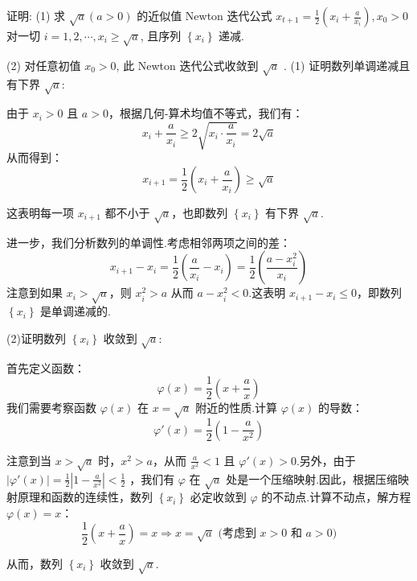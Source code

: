 \begin{tcolorbox}[enhanced,colback=10,colframe=9,breakable,coltitle=green!25!black,title=2024]
  
证明: (1) 求 $ \sqrt{a}(a>0) $ 的近似值 Newton 迭代公式
$x_{t+1}=\frac{1}{2}\left(x_{i}+\frac{a}{x_{i}}\right),  x_{0}>0$
对一切 $ i=1,2, \cdots, x_{i} \geq \sqrt{a} $, 且序列 $\left\{x_{i}\right\} $ 递减.

(2) 对任意初值 $ x_{0}>0 $, 此 Newton 迭代公式收敛到 $ \sqrt{a} $ .
\tcblower
(1) 证明数列单调递减且有下界 \(\sqrt{a}\):

由于 \( x_i > 0 \) 且 \( a > 0 \)，根据几何-算术均值不等式，我们有：
\[ x_i + \frac{a}{x_i} \geq 2\sqrt{x_i \cdot \frac{a}{x_i}} = 2\sqrt{a} \]
从而得到：
\[ x_{i+1} = \frac{1}{2}\left(x_i +\frac{a}{x_i}\right) \geq \sqrt{a} \]

这表明每一项 \( x_{i+1} \) 都不小于 \( \sqrt{a} \)，也即数列 \(\left\{x_i\right\}\) 有下界 \(\sqrt{a}\).

进一步，我们分析数列的单调性.考虑相邻两项之间的差：
\[ x_{i+1} - x_i = \frac{1}{2}\left(\frac{a}{x_i} - x_i\right) = \frac{1}{2}\left(\frac{a - x_i^2}{x_i}\right) \]
注意到如果 \( x_i > \sqrt{a} \)，则 \( x_i^2 > a \) 从而 \( a - x_i^2 < 0 \).这表明 \( x_{i+1} - x_i \leq 0 \)，即数列 \(\left\{x_i\right\}\) 是单调递减的.

(2)证明数列 \(\left\{x_i\right\}\) 收敛到 \(\sqrt{a}\):

首先定义函数：
\[ \varphi(x) = \frac{1}{2}\left(x + \frac{a}{x}\right) \]
我们需要考察函数 \(\varphi(x)\) 在 \( x = \sqrt{a} \) 附近的性质.计算 \(\varphi(x)\) 的导数：
\[ \varphi'(x) = \frac{1}{2}\left(1 - \frac{a}{x^2}\right) \]

注意到当 \( x > \sqrt{a} \) 时，\( x^2 > a \)，从而 \( \frac{a}{x^2} < 1 \) 且 \(\varphi'(x) > 0\).另外，由于 \( \left| \varphi'(x) \right| = \frac{1}{2}\left|1 - \frac{a}{x^2}\right| < \frac{1}{2} \) ，我们有 \(\varphi\) 在 \( \sqrt{a} \) 处是一个压缩映射.因此，根据压缩映射原理和函数的连续性，数列 \(\left\{x_i\right\}\) 必定收敛到 \(\varphi\) 的不动点.计算不动点，解方程 \(\varphi(x) = x\)：
\[ \frac{1}{2}\left(x + \frac{a}{x}\right) = x \Rightarrow x = \sqrt{a} \text{ (考虑到 \(x > 0\) 和 \(a > 0\))} \]

从而，数列 \(\left\{x_i\right\}\) 收敛到 \(\sqrt{a}\).

\end{tcolorbox}



